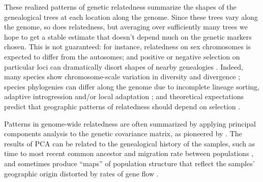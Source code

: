 \documentclass[11pt, oneside]{article}   	%
\begin{document}
These realized patterns of genetic relatedness
summarize the shapes of the genealogical trees %
at each location along the genome.
Since these trees vary along the genome, so does relatedness,
but averaging over sufficiently many trees we hope to get a stable estimate
that doesn't depend much on the genetic markers chosen.
This is not guaranteed:
for instance,
relatedness on sex chromosomes is expected to differ from the autosomes;
and positive or negative selection on particular loci can dramatically disort shapes of nearby genealogies
\citep{kim2002hitchhiking,charlesworth1993effect,barton2000genetic}.
Indeed,
many species show chromosome-scale variation in diversity and divergence
\citep[e.g.,][]{langley2012genomic};
species phylogenies can differ along the genome 
due to incomplete lineage sorting,
adaptive introgression and/or local adaptation 
\citep[e.g.,][]{pease2013accurate,ellegren2012genomic,nadeau2012genomic,pool2015natural,vernot2014resurrecting};
and theoretical expectations predict that geographic patterns of relatedness should depend on selection
\citep{charlesworth2003review}.

Patterns in genome-wide relatedness are often summarized
by applying principal components analysis \citep[PCA,][]{patterson2006population} 
to the genetic covariance matrix,
as pioneered by \citet{menozzi1978synthetic}.
The results of PCA can be related to the genealogical history of the samples, 
such as time to most recent common ancestor and migration rate between populations \citep{novembre2008interpreting,mcvean2009genealogical}, 
and sometimes produce ``maps'' of population structure
that reflect the samples' geographic origin distorted by rates of gene flow
\citep{novembre2008genes}.
\end{document}
